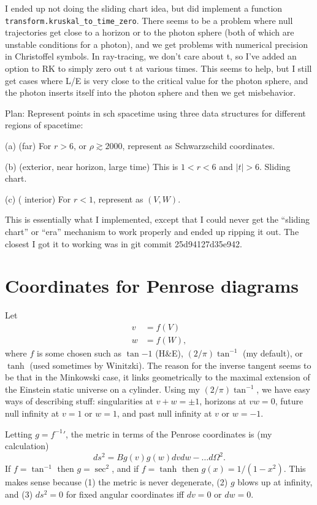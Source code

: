\documentclass{article}
\begin{document}
I ended up not doing the sliding chart idea, but did implement a function 
\texttt{transform.kruskal\_to\_time\_zero}. There seems to be a problem where null trajectories
get close to a horizon or to the photon sphere (both of which are unstable conditions for a photon),
and we get problems with numerical precision in Christoffel symbols.
In ray-tracing, we don't care about t, so I've added an option to RK
to simply zero out t at various times. This seems to help, but I still get cases where L/E is
very close to the critical value for the photon sphere, and the photon inserts itself into
the photon sphere and then we get misbehavior.

Plan: Represent points in sch spacetime using three data structures for different regions of spacetime:

(a) (far) For $r>6$,
or $\rho\gtrsim 2000$, represent as Schwarzschild coordinates.

(b) (exterior, near horizon, large time) This is $1<r<6$ and $|t|>6$. Sliding chart.

(c) ( interior) For $r<1$, represent as $(V,W)$.

This is essentially what I implemented, except that I could never get the ``sliding chart''
or ``era'' mechanism to work properly and ended up ripping it out. The closest I got it to
working was in git commit 25d94127d35e942.

\section{Coordinates for Penrose diagrams}

Let
\begin{align}
  v &= f(V)\\
  w &= f(W),
\end{align}
where $f$ is some chosen such as $\tan{-1}$ (H\&E), $(2/\pi)\tan^{-1}$ (my default),
or $\tanh$ (used sometimes by Winitzki). The reason for the inverse tangent seems to be
that in the Minkowski case, it links geometrically to the maximal extension of the Einstein static universe
on a cylinder. Using my $(2/\pi)\tan^{-1}$, we have easy ways of describing stuff:
singularities at $v+w=\pm1$, horizons at $vw=0$, future null infinity at $v=1$ or $w=1$,
and past null infinity at $v$ or $w=-1$.

Letting $g={f^{-1}}'$, the metric in terms of the Penrose coordinates is (my calculation)
\begin{equation}
  ds^2 = B g(v)g(w)dvdw-\ldots d\Omega^2.
\end{equation}
If $f=\tan^{-1}$ then $g=\sec^2$,
and if $f=\tanh$ then $g(x)=1/(1-x^2)$. This makes sense because (1) the metric is never degenerate,
(2) $g$ blows up at infinity, and (3) $ds^2=0$ for fixed angular coordinates iff $dv=0$ or $dw=0$.
\end{document}
